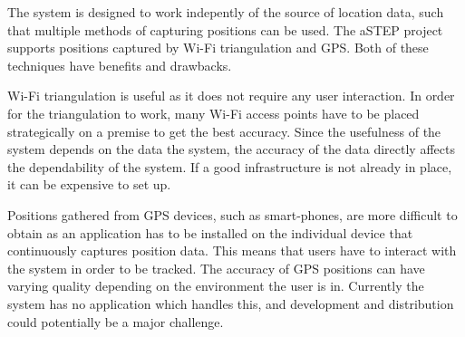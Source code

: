 The system is designed to work indepently of the source of location data, such that multiple methods of capturing positions can be used. The aSTEP project supports positions captured by Wi-Fi triangulation and GPS. Both of these techniques have benefits and drawbacks.

Wi-Fi triangulation is useful as it does not require any user interaction. In order for the triangulation to work, many Wi-Fi access points have to be placed strategically on a premise to get the best accuracy. Since the usefulness of the system depends on the data the system, the accuracy of the data directly affects the dependability of the system. If a good infrastructure is not already in place, it can be expensive to set up.

Positions gathered from GPS devices, such as smart-phones, are more difficult to obtain as an application has to be installed on the individual device that continuously captures position data. This means that users have to interact with the system in order to be tracked. The accuracy of GPS positions can have varying quality depending on the environment the user is in. Currently the system has no application which handles this, and development and distribution could potentially be a major challenge.


